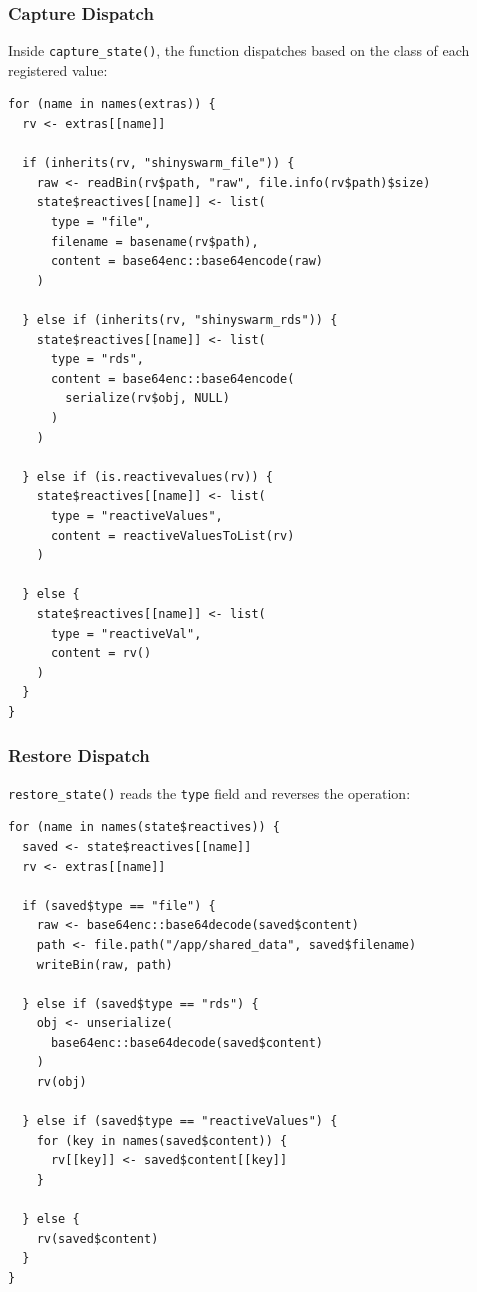 \documentclass[11pt,a4paper]{article}
\begin{document}
\subsubsection{Capture Dispatch}

Inside \texttt{capture\_state()}, the function dispatches based on the class
of each registered value:

\begin{verbatim}
for (name in names(extras)) {
  rv <- extras[[name]]

  if (inherits(rv, "shinyswarm_file")) {
    raw <- readBin(rv$path, "raw", file.info(rv$path)$size)
    state$reactives[[name]] <- list(
      type = "file",
      filename = basename(rv$path),
      content = base64enc::base64encode(raw)
    )

  } else if (inherits(rv, "shinyswarm_rds")) {
    state$reactives[[name]] <- list(
      type = "rds",
      content = base64enc::base64encode(
        serialize(rv$obj, NULL)
      )
    )

  } else if (is.reactivevalues(rv)) {
    state$reactives[[name]] <- list(
      type = "reactiveValues",
      content = reactiveValuesToList(rv)
    )

  } else {
    state$reactives[[name]] <- list(
      type = "reactiveVal",
      content = rv()
    )
  }
}
\end{verbatim}

\subsubsection{Restore Dispatch}

\texttt{restore\_state()} reads the \texttt{type} field and reverses the
operation:

\begin{verbatim}
for (name in names(state$reactives)) {
  saved <- state$reactives[[name]]
  rv <- extras[[name]]

  if (saved$type == "file") {
    raw <- base64enc::base64decode(saved$content)
    path <- file.path("/app/shared_data", saved$filename)
    writeBin(raw, path)

  } else if (saved$type == "rds") {
    obj <- unserialize(
      base64enc::base64decode(saved$content)
    )
    rv(obj)

  } else if (saved$type == "reactiveValues") {
    for (key in names(saved$content)) {
      rv[[key]] <- saved$content[[key]]
    }

  } else {
    rv(saved$content)
  }
}
\end{verbatim}
\end{document}
